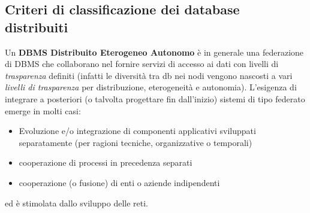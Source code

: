 \subsection{Criteri di classificazione dei database distribuiti}
Un \textbf{DBMS Distribuito Eterogeneo Autonomo} è in generale una federazione di DBMS che collaborano nel fornire servizi di accesso ai dati con livelli di \textit{trasparenza} definiti (infatti le diversità tra db nei nodi vengono nascosti a vari \textit{livelli di trasparenza} per distribuzione, eterogeneità e autonomia). 
L’esigenza di integrare a posteriori (o talvolta progettare fin dall’inizio) sistemi di tipo federato emerge in molti casi:
\begin{itemize}
    \item Evoluzione e/o integrazione di componenti applicativi sviluppati separatamente (per ragioni tecniche, organizzative o temporali)
    \item cooperazione di processi in precedenza separati 
    \item cooperazione (o fusione) di enti o aziende indipendenti 
\end{itemize} ed è stimolata dallo sviluppo delle reti.

